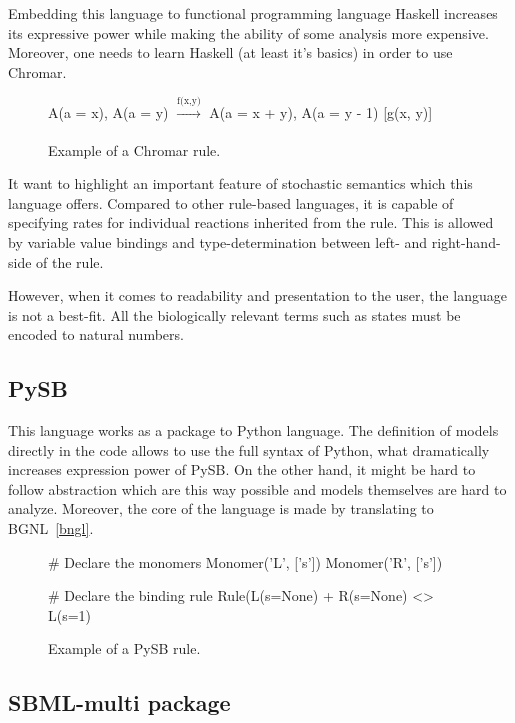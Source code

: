 \documentclass[12pt]{fithesis2}
\begin{document}
Embedding this language to functional programming language Haskell increases its expressive power while making the ability of some analysis more expensive. Moreover, one needs to learn Haskell (at least it's basics) in order to use Chromar.

\begin{figure}[!h]
\begin{center}
A(a = x), A(a = y) $\xrightarrow[]{\text{f(x,y)}}$ A(a = x + y), A(a = y - 1) [g(x, y)]
\end{center}
\caption{Example of a Chromar rule.}\label{chromar-rule}
\end{figure}

It want to highlight an important feature of stochastic semantics which this language offers. Compared to other rule-based languages, it is capable of specifying rates for individual reactions inherited from the rule. This is allowed by variable value bindings and type-determination between left- and right-hand-side of the rule.

However, when it comes to readability and presentation to the user, the language is not a best-fit. All the biologically relevant terms such as states must be encoded to natural numbers.

\subsection{PySB}

This language works as a package to Python language. The definition of models directly in the code allows to use the full syntax of Python, what dramatically increases expression power of PySB. On the other hand, it might be hard to follow abstraction which are this way possible and models themselves are hard to analyze. Moreover, the core of the language is made by translating to BGNL~\ref{bngl}.

\begin{figure}[!h]
\begin{center}
\begin{python}
# Declare the monomers
Monomer('L', ['s'])
Monomer('R', ['s'])

# Declare the binding rule
Rule(L(s=None) + R(s=None) <> L(s=1) %
\end{python}
\end{center}
\caption{Example of a PySB rule.}\label{PySB-rule}
\end{figure}

\subsection{SBML-multi package}
\end{document}
